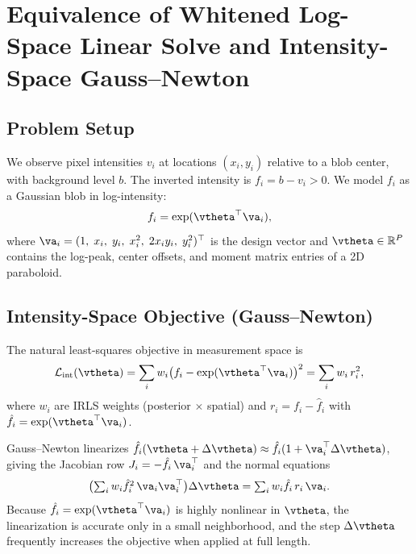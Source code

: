 
\section{Equivalence of Whitened Log-Space Linear Solve and Intensity-Space Gauss--Newton}
\label{app:whitened_linear}

\subsection{Problem Setup}

We observe pixel intensities $v_i$ at locations $(x_i, y_i)$ relative to
a blob center, with background level $b$.  The inverted intensity is
$f_i = b - v_i > 0$.  We model $f_i$ as a Gaussian blob in log-intensity:
\begin{equation}\label{eq:model}
  f_i = \exp(\vtheta^\top \va_i),
\end{equation}
where $\va_i = (1,\; x_i,\; y_i,\; x_i^2,\; 2x_i y_i,\; y_i^2)^\top$
is the design vector and $\vtheta \in \mathbb{R}^P$ contains the
log-peak, center offsets, and moment matrix entries of a 2D paraboloid.

\subsection{Intensity-Space Objective (Gauss--Newton)}

The natural least-squares objective in measurement space is
\begin{equation}\label{eq:intensity_obj}
  \mathcal{L}_{\mathrm{int}}(\vtheta)
  = \sum_i w_i \bigl(f_i - \exp(\vtheta^\top \va_i)\bigr)^2
  = \sum_i w_i\, r_i^2,
\end{equation}
where $w_i$ are IRLS weights (posterior $\times$ spatial) and
$r_i = f_i - \hat{f}_i$ with $\hat{f}_i = \exp(\vtheta^\top \va_i)$.

Gauss--Newton linearizes $\hat{f}_i(\vtheta + \Delta\vtheta)
\approx \hat{f}_i(1 + \va_i^\top \Delta\vtheta)$, giving the
Jacobian row $J_i = -\hat{f}_i\, \va_i^\top$ and the normal equations
\begin{equation}\label{eq:gn}
  \bigl(\textstyle\sum_i w_i \hat{f}_i^2\, \va_i \va_i^\top\bigr)
  \Delta\vtheta
  = \sum_i w_i \hat{f}_i\, r_i\, \va_i.
\end{equation}
Because $\hat{f}_i = \exp(\vtheta^\top \va_i)$ is highly nonlinear in
$\vtheta$, the linearization is accurate only in a small neighborhood,
and the step $\Delta\vtheta$ frequently increases the objective when
applied at full length.

